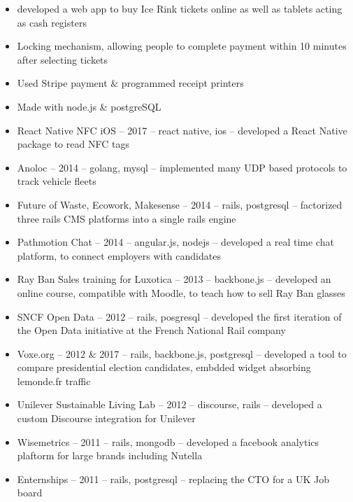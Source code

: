 \documentclass[10pt,a4paper,ragged2e,withhyper]{altacv}
\begin{document}
\begin{paracol}{2}
\divider

\begin{itemize}
  \item developed a web app to buy Ice Rink tickets online as well as tablets acting as cash registers
  \item Locking mechanism, allowing people to complete payment within 10 minutes after selecting tickets
  \item Used Stripe payment \& programmed receipt printers
  \item Made with node.js \& postgreSQL
\end{itemize}

\divider

\begin{itemize}
  \item React Native NFC iOS -- 2017 -- react native, ios -- developed a React Native package to read NFC tags
  \item Anoloc -- 2014 -- golang, mysql -- implemented many UDP based protocols to track vehicle fleets
  \item Future of Waste, Ecowork, Makesense -- 2014 -- rails, postgresql -- factorized three rails CMS platforms into a single rails engine
  \item Pathmotion Chat -- 2014 -- angular.js, nodejs -- developed a real time chat platform, to connect employers with candidates
  \item Ray Ban Sales training for Luxotica -- 2013 -- backbone.js -- developed an online course, compatible with Moodle, to teach how to sell Ray Ban glasses
  \item SNCF Open Data -- 2012 -- rails, posgresql -- developed the first iteration of the Open Data initiative at the French National Rail company
  \item Voxe.org -- 2012 \& 2017 -- rails, backbone.js, postgresql  -- developed a tool to compare presidential election candidates, embdded widget absorbing lemonde.fr traffic
  \item Unilever Sustainable Living Lab -- 2012 -- discourse, rails -- developed a custom Discourse integration for Unilever
  \item Wisemetrics -- 2011 -- rails, mongodb -- developed a facebook analytics plaftorm for large brands including Nutella
  \item Enternships -- 2011 -- rails, postgresql -- replacing the CTO for a UK Job board
\end{itemize}



\end{paracol}
\end{document}
